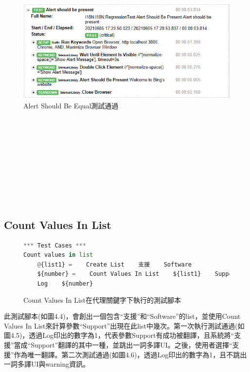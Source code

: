 \begin{figure}[H]
\includegraphics[width= \textwidth]{../論文截圖/4.1.1-3 pass.png}
\caption{Alert Should Be Equal測試通過}
\end{figure}

\hspace*{\fill} \\
\\ \hspace*{\fill} \\
\\ \hspace*{\fill} \\
\\ \hspace*{\fill} \\
\\ \hspace*{\fill} \\
\subsection{Count Values In List}
\begin{figure}[H]
\begin{lstlisting}[language={python}]
*** Test Cases ***
Count values in list
    @{list1} =    Create List    支援    Software
    ${number} =    Count Values In List    ${list1}    Support
    Log    ${number}
\end{lstlisting}
\caption{Count Values In List在代理關鍵字下執行的測試腳本}
\end{figure}
此測試腳本(如圖4.4)，會創出一個包含“支援”和“Software”的list，並使用Count Values In List來計算參數“Support”出現在此list中幾次。第一次執行測試通過(如圖4.5)，透過Log印出的數字為1，代表參數Support有成功被翻譯，且系統將“支援”當成“Support”翻譯的其中一種，並跳出一詞多譯UI。之後，使用者選擇“支援”作為唯一翻譯。第二次測試通過(如圖4.6)，透過Log印出的數字為1，且不跳出一詞多譯UI與warning資訊。

